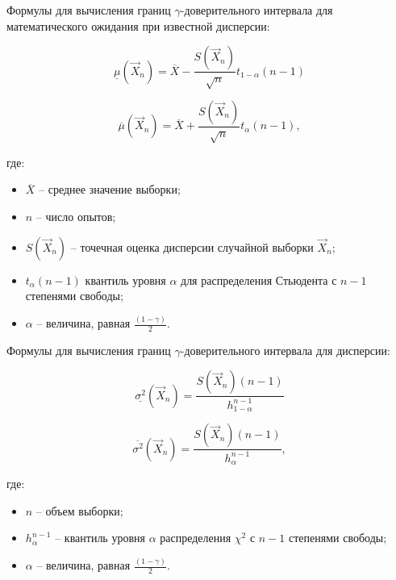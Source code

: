 Формулы для вычисления границ $\gamma$-доверительного интервала для математического ожидания при известной дисперсии:

\begin{equation}
	\label{eq:low_mu}
	\underline{\mu}(\vec{X}_{n}) = \overline{X}-\frac{S(\vec{X}_{n})}{\sqrt{n}}t_{1-\alpha}(n-1)
\end{equation}

\begin{equation}
	\label{eq:high_mu}
	\overline{\mu}(\vec{X}_{n}) = \overline{X}+\frac{S(\vec{X}_{n})}{\sqrt{n}}t_{\alpha}(n-1),
\end{equation}

\noindent где:
\begin{itemize}
	\item $\overline{X}$ -- среднее значение выборки;
	\item $n$ -- число опытов;
	\item $S(\vec{X}_{n})$ -- точечная оценка дисперсии случайной выборки $\vec{X}_{n}$;
	\item $t_{\alpha}(n-1)$ квантиль уровня $\alpha$ для распределения Стьюдента с $n-1$ степенями свободы;
	\item $\alpha$ -- величина, равная $\displaystyle\frac{(1-\gamma)}{2}$.
\end{itemize}

Формулы для вычисления границ $\gamma$-доверительного интервала для дисперсии:

\begin{equation}
	\label{eq:low_sigma}
	\underline{\sigma^{2}}(\vec{X}_{n})  =\frac{S(\vec{X}_{n})(n-1)}{h_{1-\alpha}^{n-1}}
\end{equation}

\begin{equation}
	\label{eq:high_sigma}
	\overline{\sigma^{2}}(\vec{X}_{n})  =\frac{S(\vec{X}_{n})(n-1)}{h_{\alpha}^{n-1}},
\end{equation}

\noindent где:
\begin{itemize}
	\item $n$ -- объем выборки;
	\item $h_{\alpha}^{n-1}$ -- квантиль уровня $\alpha$ распределения $\chi^{2}$ с $n-1$ степенями свободы;
	\item $\alpha$ -- величина, равная $\displaystyle\frac{(1-\gamma)}{2}$.
\end{itemize}